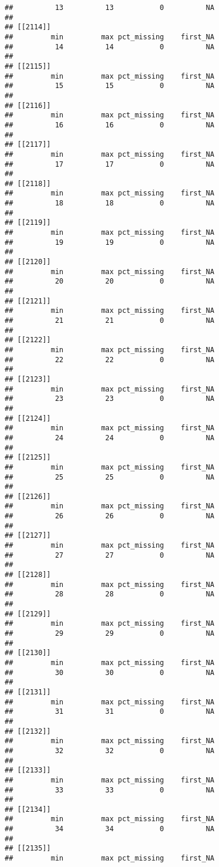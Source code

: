 \documentclass[
]{article}
\begin{document}
\begin{verbatim}
##          13          13           0          NA 
## 
## [[2114]]
##         min         max pct_missing    first_NA 
##          14          14           0          NA 
## 
## [[2115]]
##         min         max pct_missing    first_NA 
##          15          15           0          NA 
## 
## [[2116]]
##         min         max pct_missing    first_NA 
##          16          16           0          NA 
## 
## [[2117]]
##         min         max pct_missing    first_NA 
##          17          17           0          NA 
## 
## [[2118]]
##         min         max pct_missing    first_NA 
##          18          18           0          NA 
## 
## [[2119]]
##         min         max pct_missing    first_NA 
##          19          19           0          NA 
## 
## [[2120]]
##         min         max pct_missing    first_NA 
##          20          20           0          NA 
## 
## [[2121]]
##         min         max pct_missing    first_NA 
##          21          21           0          NA 
## 
## [[2122]]
##         min         max pct_missing    first_NA 
##          22          22           0          NA 
## 
## [[2123]]
##         min         max pct_missing    first_NA 
##          23          23           0          NA 
## 
## [[2124]]
##         min         max pct_missing    first_NA 
##          24          24           0          NA 
## 
## [[2125]]
##         min         max pct_missing    first_NA 
##          25          25           0          NA 
## 
## [[2126]]
##         min         max pct_missing    first_NA 
##          26          26           0          NA 
## 
## [[2127]]
##         min         max pct_missing    first_NA 
##          27          27           0          NA 
## 
## [[2128]]
##         min         max pct_missing    first_NA 
##          28          28           0          NA 
## 
## [[2129]]
##         min         max pct_missing    first_NA 
##          29          29           0          NA 
## 
## [[2130]]
##         min         max pct_missing    first_NA 
##          30          30           0          NA 
## 
## [[2131]]
##         min         max pct_missing    first_NA 
##          31          31           0          NA 
## 
## [[2132]]
##         min         max pct_missing    first_NA 
##          32          32           0          NA 
## 
## [[2133]]
##         min         max pct_missing    first_NA 
##          33          33           0          NA 
## 
## [[2134]]
##         min         max pct_missing    first_NA 
##          34          34           0          NA 
## 
## [[2135]]
##         min         max pct_missing    first_NA 

\end{verbatim}
\end{document}
